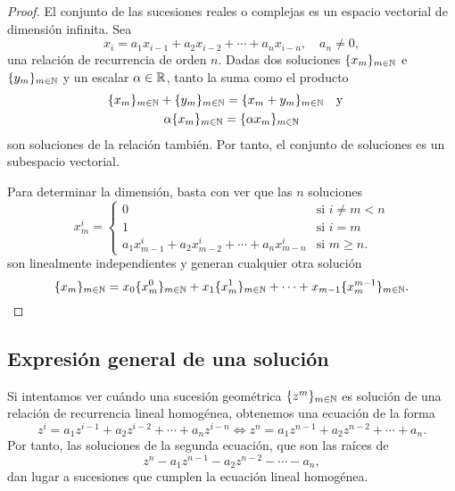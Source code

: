 \begin{proof}
    El conjunto de las sucesiones reales o complejas
    es un espacio vectorial de dimensión infinita.
    Sea
    \begin{equation*}
        x_i = a_1x_{i-1} + a_2x_{i-2} + \cdots + a_nx_{i-n},
        \quad a_n \ne 0,
    \end{equation*}
    una relación de recurrencia de orden $n$.
    Dadas dos soluciones $\{x_m\}_{m \in \mathbb{N}}$ e $\{y_m\}_{m \in \mathbb{N}}$
    y un escalar $\alpha \in \mathbb{R}$,
    tanto la suma como el producto
    \begin{gather*}
        \{x_m\}_{m \in \N} + \{y_m\}_{m \in \N} =
            \{x_m + y_m\}_{m \in \N} \qq{y} \\
        \alpha\{x_m\}_{m \in \N} =
            \{\alpha x_m\}_{m \in \N}
    \end{gather*}
    son soluciones de la relación también.
    Por tanto, el conjunto de soluciones es un subespacio vectorial.

    Para determinar la dimensión, basta con ver que las $n$ soluciones
    \begin{equation*}
        x^i_m =
        \begin{cases}
            0 & \text{si $i \ne m < n$} \\
            1 & \text{si $i = m$} \\
            a_1x^i_{m-1} + a_2x^i_{m-2} + \cdots + a_nx^i_{m-n}
                & \text{si $m \ge n$.}
        \end{cases}
    \end{equation*}
    son linealmente independientes y generan cualquier otra solución
    \begin{equation*}
        \{x_m\}_{m \in \mathbb{N}} =
        x_0\{x^0_m\}_{m \in \mathbb{N}} + x_1\{x^1_m\}_{m \in \mathbb{N}} + \cdots +
        x_{m-1}\{x^{m-1}_m\}_{m \in \mathbb{N}}. \qedhere
    \end{equation*}
\end{proof}

\subsection{Expresión general de una solución}

Si intentamos ver cuándo una sucesión geométrica $\{z^m\}_{m \in \mathbb{N}}$
es solución de una relación de recurrencia lineal homogénea,
obtenemos una ecuación de la forma
\begin{equation*}
    z^i = a_1z^{i-1} + a_2z^{i-2} + \cdots + a_nz^{i-n} \iff
    z^n = a_1z^{n-1} + a_2z^{n-2} + \cdots + a_n.
\end{equation*}
Por tanto, las soluciones de la segunda ecuación,
que son las raíces de
\begin{equation*}
    z^n - a_1z^{n-1} - a_2z^{n-2} - \cdots - a_n,
\end{equation*}
dan lugar a sucesiones que cumplen la ecuación lineal homogénea.

